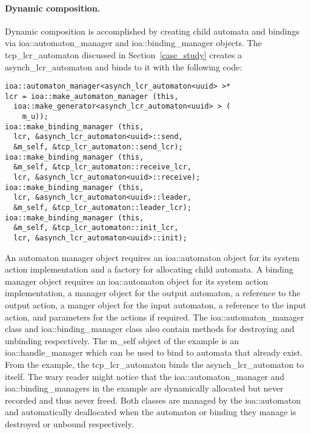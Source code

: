 \paragraph*{Dynamic composition.}
Dynamic composition is accomplished by creating child automata and bindings via ioa::automaton\_manager and ioa::binding\_manager objects.
\ifjournal
The tcp\_lcr\_automaton discussed in Section~\ref{case_study} creates a asynch\_lcr\_automaton and binds to it with the following code:
\begin{lstlisting}
ioa::automaton_manager<asynch_lcr_automaton<uuid> >*
lcr = ioa::make_automaton_manager (this,
  ioa::make_generator<asynch_lcr_automaton<uuid> > (
    m_u));
ioa::make_binding_manager (this,
  lcr, &asynch_lcr_automaton<uuid>::send,
  &m_self, &tcp_lcr_automaton::send_lcr);
ioa::make_binding_manager (this,
  &m_self, &tcp_lcr_automaton::receive_lcr,
  lcr, &asynch_lcr_automaton<uuid>::receive);
ioa::make_binding_manager (this,
  lcr, &asynch_lcr_automaton<uuid>::leader,
  &m_self, &tcp_lcr_automaton::leader_lcr);
ioa::make_binding_manager (this,
  &m_self, &tcp_lcr_automaton::init_lcr,
  lcr, &asynch_lcr_automaton<uuid>::init);
\end{lstlisting}
\fi
An automaton manager object requires an ioa::automaton object for its system action implementation and a factory for allocating child automata.
A binding manager object requires an ioa::automaton object for its system action implementation, a manager object for the output automaton, a reference to the output action, a manger object for the input automaton, a reference to the input action, and parameters for the actions if required.
The ioa::automaton\_manager class and ioa::binding\_manager class also contain methods for destroying and unbinding respectively.
\ifjournal
The m\_self object of the example is an ioa::handle\_manager which can be used to bind to automata that already exist.
From the example, the tcp\_lcr\_automaton binds the asynch\_lcr\_automaton to itself.
The wary reader might notice that the ioa::automaton\_manager and ioa::binding\_managers in the example are dynamically allocated but never recorded and thus never freed.
Both classes are managed by the ioa::automaton and automatically deallocated when the automaton or binding they manage is destroyed or unbound respectively.
\fi

